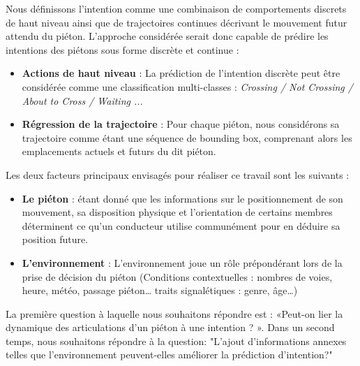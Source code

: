 Nous définissons l'intention comme une combinaison de comportements discrets de haut niveau ainsi que de trajectoires continues décrivant le mouvement futur attendu du piéton. L’approche considérée serait donc capable de prédire les intentions des piétons sous forme discrète et continue : 

\begin{itemize}
    \item \textbf{Actions de haut niveau} : La prédiction de l'intention discrète peut être considérée comme une classification multi-classes : \textit{Crossing / Not Crossing / About to Cross / Waiting ...}
    \item \textbf{Régression de la trajectoire} : Pour chaque piéton, nous considérons sa trajectoire comme étant une séquence de bounding box, comprenant alors les emplacements actuels et futurs du dit piéton.
\end{itemize}

Les deux facteurs principaux envisagés pour réaliser ce travail sont les suivants :

\begin{itemize}
    \item  \textbf{Le piéton} : étant donné que les informations sur le positionnement de son mouvement, sa disposition physique et l'orientation de certains membres déterminent ce qu'un conducteur utilise communément pour en déduire sa position future.
    \item \textbf{L’environnement} : L’environnement joue un rôle prépondérant lors de la prise de décision du piéton (Conditions contextuelles : nombres de voies, heure, météo, passage piéton… traits signalétiques : genre, âge…)
\end{itemize}

La première question à laquelle nous souhaitons répondre est : «Peut-on lier la dynamique des articulations d'un piéton à une intention ? ». Dans un second temps, nous souhaitons répondre à la question: "L'ajout d'informations annexes telles que l'environnement peuvent-elles améliorer la prédiction d'intention?"













